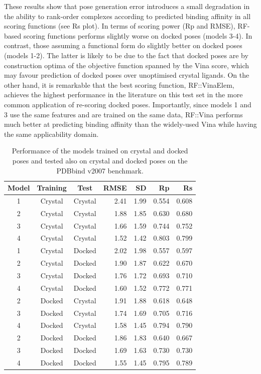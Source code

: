 These results show that pose generation error introduces a small degradation in the ability to rank-order complexes according to predicted binding affinity in all scoring functions (see Rs plot). In terms of scoring power (Rp and RMSE), RF-based scoring functions performs slightly worse on docked poses (models 3-4). In contrast, those assuming a functional form do slightly better on docked poses (models 1-2). The latter is likely to be due to the fact that docked poses are by construction optima of the objective function spanned by the Vina score, which may favour prediction of docked poses over unoptimised crystal ligands. On the other hand, it is remarkable that the best scoring function, RF::VinaElem, achieves the highest performance in the literature on this test set in the more common application of re-scoring docked poses. Importantly, since models 1 and 3 use the same features and are trained on the same data, RF::Vina performs much better at predicting binding affinity than the widely-used Vina while having the same applicability domain.

\begin{table}
\caption{Performance of the models trained on crystal and docked poses and tested also on crystal and docked poses on the PDBbind v2007 benchmark.}
\label{rfscore4:set-1-pdbbind-2007}
\begin{tabular}{cccrrrr}
\hline
Model & Training & Test & RMSE & SD & Rp & Rs\\
\hline
1 & Crystal & Crystal & 2.41 & 1.99 & 0.554 & 0.608\\
2 & Crystal & Crystal & 1.88 & 1.85 & 0.630 & 0.680\\
3 & Crystal & Crystal & 1.66 & 1.59 & 0.744 & 0.752\\
4 & Crystal & Crystal & 1.52 & 1.42 & 0.803 & 0.799\\
\hline
1 & Crystal & Docked  & 2.02 & 1.98 & 0.557 & 0.597\\
2 & Crystal & Docked  & 1.90 & 1.87 & 0.622 & 0.670\\
3 & Crystal & Docked  & 1.76 & 1.72 & 0.693 & 0.710\\
4 & Crystal & Docked  & 1.60 & 1.52 & 0.772 & 0.771\\
\hline
2 & Docked  & Crystal & 1.91 & 1.88 & 0.618 & 0.648\\
3 & Docked  & Crystal & 1.74 & 1.69 & 0.705 & 0.716\\
4 & Docked  & Crystal & 1.58 & 1.45 & 0.794 & 0.790\\
\hline
2 & Docked  & Docked  & 1.86 & 1.83 & 0.640 & 0.667\\
3 & Docked  & Docked  & 1.69 & 1.63 & 0.730 & 0.730\\
4 & Docked  & Docked  & 1.55 & 1.45 & 0.795 & 0.789\\
\hline
\end{tabular}
\end{table}

